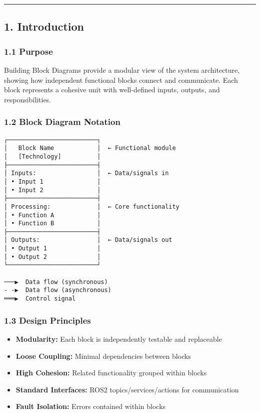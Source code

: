 \documentclass[
]{article}
\providecommand{\tightlist}{%
  \setlength{\itemsep}{0pt}\setlength{\parskip}{0pt}}
\begin{document}
\begin{center}\rule{0.5\linewidth}{0.5pt}\end{center}

\hypertarget{introduction}{%
\subsection{1. Introduction}\label{introduction}}

\hypertarget{purpose}{%
\subsubsection{1.1 Purpose}\label{purpose}}

Building Block Diagrams provide a modular view of the system
architecture, showing how independent functional blocks connect and
communicate. Each block represents a cohesive unit with well-defined
inputs, outputs, and responsibilities.

\hypertarget{block-diagram-notation}{%
\subsubsection{1.2 Block Diagram
Notation}\label{block-diagram-notation}}

\begin{verbatim}
┌─────────────────────────┐
│   Block Name            │  ← Functional module
│   [Technology]          │
├─────────────────────────┤
│ Inputs:                 │  ← Data/signals in
│ • Input 1               │
│ • Input 2               │
├─────────────────────────┤
│ Processing:             │  ← Core functionality
│ • Function A            │
│ • Function B            │
├─────────────────────────┤
│ Outputs:                │  ← Data/signals out
│ • Output 1              │
│ • Output 2              │
└─────────────────────────┘

───▶  Data flow (synchronous)
- -▶  Data flow (asynchronous)
═══▶  Control signal
\end{verbatim}

\hypertarget{design-principles}{%
\subsubsection{1.3 Design Principles}\label{design-principles}}

\begin{itemize}
\tightlist
\item
  \textbf{Modularity:} Each block is independently testable and
  replaceable
\item
  \textbf{Loose Coupling:} Minimal dependencies between blocks
\item
  \textbf{High Cohesion:} Related functionality grouped within blocks
\item
  \textbf{Standard Interfaces:} ROS2 topics/services/actions for
  communication
\item
  \textbf{Fault Isolation:} Errors contained within blocks
\end{itemize}
\end{document}
